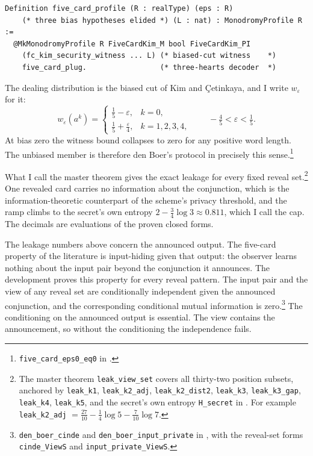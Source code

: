 \documentclass[runningheads]{llncs}
\newcommand{\coqin}[1]{\texttt{#1}}
\begin{document}
\begin{lstlisting}
Definition five_card_profile (R : realType) (eps : R)
    (* three bias hypotheses elided *) (L : nat) : MonodromyProfile R :=
  @MkMonodromyProfile R FiveCardKim_M bool FiveCardKim_PI
    (fc_kim_security_witness ... L) (* biased-cut witness    *)
    five_card_plug.                 (* three-hearts decoder  *)
\end{lstlisting}

The dealing distribution is the biased cut of Kim and \c{C}etinkaya,
and I write $w_\varepsilon$ for it:
\begin{equation}
  w_\varepsilon(a^k)=\begin{cases}\tfrac{1}{5}-\varepsilon, & k=0,\\[2pt]
  \tfrac{1}{5}+\tfrac{\varepsilon}{4}, & k=1,2,3,4,\end{cases}
  \qquad -\tfrac{4}{5}<\varepsilon<\tfrac{1}{5}.
  \label{eq:fivecard-weight}
\end{equation}
At bias zero the witness bound collapses to zero for any positive word
length. The unbiased member is therefore den Boer's protocol in
precisely this sense.\footnote{\coqin{five\_card\_eps0\_eq0} in
.}

What I call the master theorem gives the exact leakage for every fixed reveal set.\footnote{The master theorem \coqin{leak\_view\_set} covers all
thirty-two position subsets, anchored by \coqin{leak\_k1},
\coqin{leak\_k2\_adj}, \coqin{leak\_k2\_dist2}, \coqin{leak\_k3},
\coqin{leak\_k3\_gap}, \coqin{leak\_k4}, \coqin{leak\_k5}, and the secret's
own entropy \coqin{H\_secret} in
. For example
\coqin{leak\_k2\_adj} $=\tfrac{27}{10}-\tfrac14\log 5-\tfrac{7}{10}\log
7$.} One revealed card carries no information about the conjunction, which
is the information-theoretic counterpart of the scheme's privacy
threshold, and the ramp climbs to the secret's own entropy
$2-\tfrac34\log 3\approx 0.811$, which I call the cap. The decimals are
evaluations of the proven closed forms.

The leakage numbers above concern the announced output. The five-card
property of the literature is input-hiding given that output: the observer
learns nothing about the input pair beyond the conjunction it announces.
The development proves this property for every reveal pattern. The input
pair and the view of any reveal set are conditionally independent given the
announced conjunction, and the corresponding conditional mutual information
is zero.\footnote{\coqin{den\_boer\_cinde} and
\coqin{den\_boer\_input\_private} in
, with the
reveal-set forms \coqin{cinde\_ViewS} and \coqin{input\_private\_ViewS}.}
The conditioning on the announced output is essential. The view contains
the announcement, so without the conditioning the independence fails.
\end{document}
